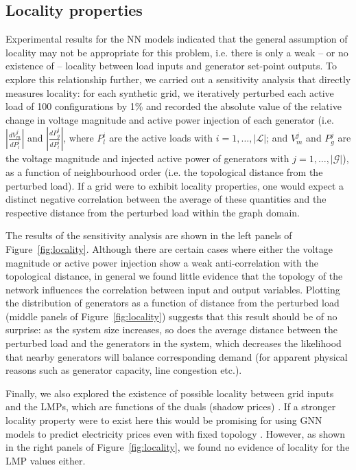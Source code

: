\documentclass[journal]{IEEEtran}
\newcommand{\Load}{\mathcal{L}}
\newcommand{\Generator}{\mathcal{G}}
\begin{document}
\subsection{Locality properties}
Experimental results for the NN models indicated that the general assumption of locality may not be appropriate for this problem, i.e. there is only a weak -- or no existence of -- locality between load inputs and generator set-point outputs. To explore this relationship further, we carried out a sensitivity analysis that directly measures locality: for each synthetic grid, we iteratively perturbed each active load of 100 configurations by 1\% and recorded the absolute value of the relative change in voltage magnitude and active power injection of each generator (i.e. $\left| \frac{dV_{m}^{j}}{dP_{l}^{i}} \right|$ and $\left| \frac{dP_{g}^{j}}{dP_{l}^{i}} \right|$, where $P_{l}^{i}$ are the active loads with $i = 1, \dots, |\Load|$; and $V_{m}^{j}$ and $P_{g}^{j}$ are the voltage magnitude and injected active power of generators with $j = 1, \dots, |\Generator|$), as a function of neighbourhood order (i.e. the topological distance from the perturbed load). If a grid were to exhibit locality properties, one would expect a distinct negative correlation between the average of these quantities and the respective distance from the perturbed load within the graph domain.

The results of the sensitivity analysis are shown in the left panels of Figure~\ref{fig:locality}.
Although there are certain cases where either the voltage magnitude or active power injection show a weak anti-correlation with the topological distance, in general we found little evidence that the topology of the network influences the correlation between input and output variables. Plotting the distribution of generators as a function of distance from the perturbed load (middle panels of Figure~\ref{fig:locality}) suggests that this result should be of no surprise: as the system size increases, so does the average distance between the perturbed load and the generators in the system, which decreases the likelihood that nearby generators will balance corresponding demand (for apparent physical reasons such as generator capacity, line congestion etc.).

Finally, we also explored the existence of possible locality between grid inputs and the LMPs, which are functions of the duals (shadow prices) \cite{Singhal2019}. If a stronger locality property were to exist here this would be promising for using GNN models to predict electricity prices even with fixed topology \cite{Liu2021}. However, as shown in the right panels of Figure~\ref{fig:locality}, we found no evidence of locality for the LMP values either. 
\end{document}
